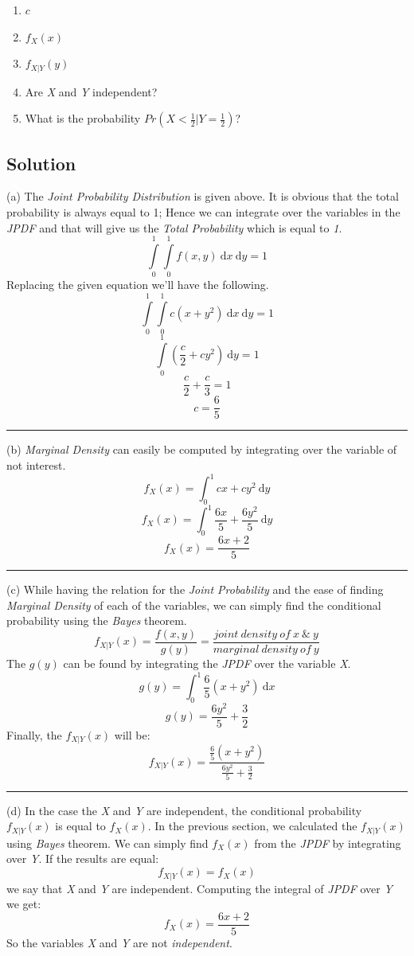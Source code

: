 \documentclass[12pt]{article}
\numberwithin{equation}{section}
\numberwithin{table}{section}
\numberwithin{figure}{section}
\begin{document}
\begin{enumerate}[label=(\alph*)]
	\item \textit{$c$}
	
	\item \textit{$f_X (x)$}
	
	\item \textit{$f_{X|Y} (y)$}
	
	\item Are \textit{X} and \textit{Y} independent?
	
	\item What is the probability $Pr(X<\frac{1}{2}  | Y = \frac{1}{2})
	$?
	 
\end{enumerate}

\subsection*{Solution}
(a) The \textit{Joint Probability Distribution} is given above. It is obvious that the total probability is always equal to 1; Hence we can integrate over the variables in the \textit{JPDF} and that will give us the \textit{Total Probability} which is equal to \textit{1}.
$$
\int\limits_{0}^{1} \int\limits_{0}^{1}f(x, y)\ \mathrm{d}x \ \mathrm{d}y=1
$$
Replacing the given equation we'll have the following.
$$
\int\limits_{0}^{1} \int\limits_{0}^{1}c(x+ y^2)\ \mathrm{d}x \ \mathrm{d}y=1
$$ 
$$
\int\limits_{0}^{1}(\frac{c}{2} + cy^2) \ \mathrm{d}y=1
$$ 
$$
	\frac{c}{2} + \frac{c}{3} = 1
$$ 
$$
	\boxed{c = \frac{6}{5}}
$$
\noindent\rule{\textwidth}{.5pt}
(b) \textit{Marginal Density} can easily be computed by integrating over the variable of not interest. 
$$
	f_X (x) = \int_{0}^{1} cx + cy^2 \ \mathrm{d}y
$$
$$
	f_X (x) = \int_{0}^{1} \frac{6x}{5} + \frac{6y^2}{5} \ \mathrm{d}y
$$
$$
	\boxed{f_X (x) = \frac{6x+2}{5}}
$$
\noindent\rule{\textwidth}{.5pt}
(c) While having the relation for the \textit{Joint Probability} and the ease of finding \textit{Marginal Density} of each of the variables, we can simply find the conditional probability using the \textit{Bayes} theorem.
\begin{equation}\label{eq:3.1}
	f_{X|Y} (x) = \frac{f(x, y)}{g(y)}  = \frac{joint\ density\ of\ x\ \&\ y}{marginal\ density\ of\ y}
\end{equation}
The $g(y)$ can be found by integrating the \textit{JPDF} over the variable \textit{X}.
$$
g(y) = \int_{0}^{1} \frac{6}{5}(x+y^2)\ \mathrm{d}x
$$
$$
g(y) = \frac{6y^2}{5} + \frac{3}{2}
$$
Finally, the $f_{X|Y} (x)$ will be:
$$
	f_{X|Y} (x) = \frac{\frac{6}{5}(x+y^2)}{\frac{6y^2}{5} + \frac{3}{2}}
$$
\noindent\rule{\textwidth}{.5pt}
(d) In the case the \textit{X} and \textit{Y} are independent, the conditional probability $f_{X|Y} (x)$ is equal to $f_{X} (x)$. In the previous section, we calculated the $f_{X|Y} (x)$ using \textit{Bayes} theorem. We can simply find $f_{X} (x)$ from the \textit{JPDF} by integrating over \textit{Y}. If the results are equal:
$$
	f_{X|Y} (x) = f_{X} (x)
$$
we say that \textit{X} and \textit{Y} are independent.
Computing the integral of \textit{JPDF} over \textit{Y} we get:
$$
	f_X (x) = \frac{6x+2}{5}
$$
So the variables \textit{X} and \textit{Y} are not \textit{independent}.
\end{document}
